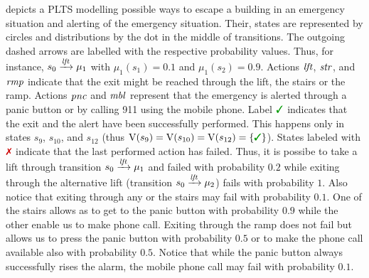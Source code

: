\begin{example}[Running]\label{ex:running}
   depicts a PLTS modelling possible ways to
  escape a building in an emergency situation and alerting of the
  emergency situation.  Their, states are represented by circles and
  distributions by the dot in the middle of transitions.  The outgoing
  dashed arrows are labelled with the respective probability values.
  Thus, for instance, $s_0\xrightarrow{\mathit{lft}}\mu_1$ with $\mu_1(s_1)=0.1$
  and $\mu_1(s_2)=0.9$.
  Actions $\mathit{lft}$, $\mathit{str}$, and $\mathit{rmp}$ indicate that the exit might
  be reached through the lift, the stairs or the ramp.  Actions
  $\mathit{pnc}$ and $\mathit{mbl}$ represent that the emergency is alerted
  through a panic button or by calling 911 using the mobile phone.
  Label $\goal$ indicates that the exit and the alert have been
  successfully performed.  This happens only in states $s_9$,
  $s_{10}$, and $s_{12}$ (thus
  $\V(s_9)=\V(s_{10})=\V(s_{12})=\{\goal\}$).  States labeled with
  $\fail$ indicate that the last performed action has failed.
  Thus, it is possibe to take a lift through transition
  $s_0\xrightarrow{\mathit{lft}}\mu_1$ and failed with probability $0.2$ while
  exiting through the alternative lift (transition
  $s_0\xrightarrow{\mathit{lft}}\mu_2$) fails with probability $1$.
  Also notice that exiting through any or the stairs may fail with
  probability $0.1$.  One of the stairs allows as to get to the panic
  button with probability $0.9$ while the other enable us to make
  phone call.  Exiting through the ramp does not fail but allows us to
  press the panic button with probability $0.5$ or to make the phone
  call available also with probability $0.5$.
  Notice that while the panic button always successfully rises the
  alarm, the mobile phone call may fail with probability $0.1$.




  
\end{example}




